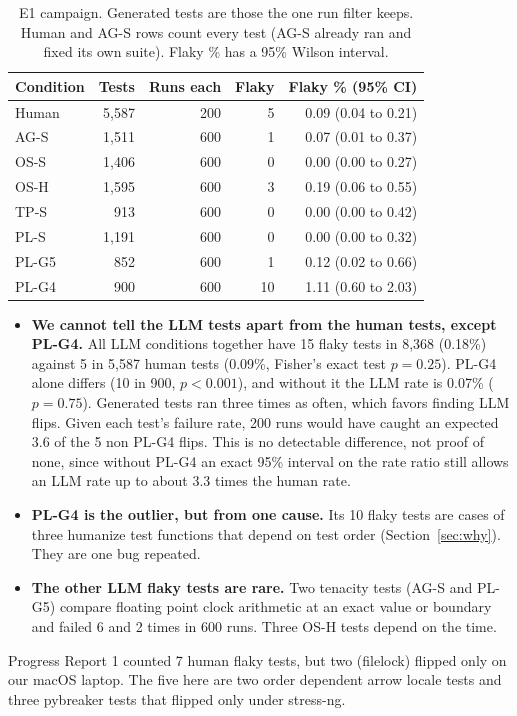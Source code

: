 \documentclass[sigconf,nonacm]{acmart}
\begin{document}
\begin{table}[h]
\caption{E1 campaign. Generated tests are those the one run filter keeps. Human and AG-S rows count every test (AG-S already ran and fixed its own suite). Flaky \% has a 95\% Wilson interval.}
\label{tab:scale}
\small
\begin{tabular}{lrrrr}
\toprule
Condition & Tests & Runs each & Flaky & Flaky \% (95\% CI) \\
\midrule
Human & 5,587 & 200 & 5 & 0.09 (0.04 to 0.21) \\
AG-S & 1,511 & 600 & 1 & 0.07 (0.01 to 0.37) \\
OS-S & 1,406 & 600 & 0 & 0.00 (0.00 to 0.27) \\
OS-H & 1,595 & 600 & 3 & 0.19 (0.06 to 0.55) \\
TP-S & 913 & 600 & 0 & 0.00 (0.00 to 0.42) \\
PL-S & 1,191 & 600 & 0 & 0.00 (0.00 to 0.32) \\
PL-G5 & 852 & 600 & 1 & 0.12 (0.02 to 0.66) \\
PL-G4 & 900 & 600 & 10 & 1.11 (0.60 to 2.03) \\
\bottomrule
\end{tabular}
\end{table}

\begin{itemize}
\item \textbf{We cannot tell the LLM tests apart from the human tests, except PL-G4.} All LLM conditions together have 15 flaky tests in 8,368 (0.18\%) against 5 in 5,587 human tests (0.09\%, Fisher's exact test $p = 0.25$). PL-G4 alone differs (10 in 900, $p < 0.001$), and without it the LLM rate is 0.07\% ($p = 0.75$). Generated tests ran three times as often, which favors finding LLM flips. Given each test's failure rate, 200 runs would have caught an expected 3.6 of the 5 non PL-G4 flips. This is no detectable difference, not proof of none, since without PL-G4 an exact 95\% interval on the rate ratio still allows an LLM rate up to about 3.3 times the human rate.
\item \textbf{PL-G4 is the outlier, but from one cause.} Its 10 flaky tests are cases of three humanize test functions that depend on test order (Section~\ref{sec:why}). They are one bug repeated.
\item \textbf{The other LLM flaky tests are rare.} Two tenacity tests (AG-S and PL-G5) compare floating point clock arithmetic at an exact value or boundary and failed 6 and 2 times in 600 runs. Three OS-H tests depend on the time.
\end{itemize}
Progress Report 1 counted 7 human flaky tests, but two (filelock) flipped only on our macOS laptop. The five here are two order dependent arrow locale tests and three pybreaker tests that flipped only under stress-ng.
\end{document}
